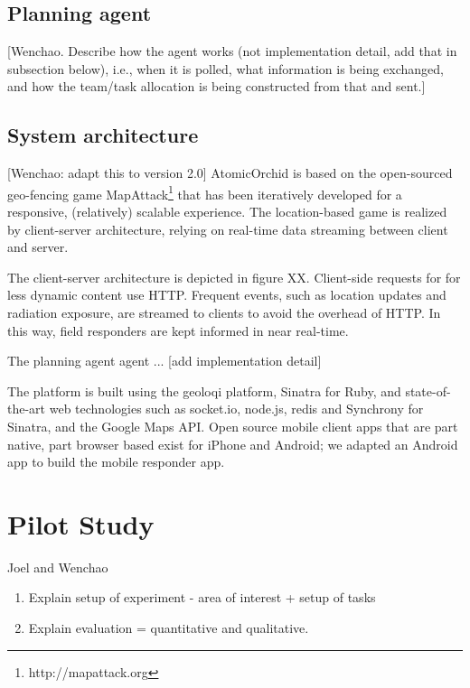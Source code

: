 \documentclass{aamas2014}
\begin{document}
\subsection{Planning agent}
[Wenchao. Describe how the agent works (not implementation detail, add that in subsection below), i.e., when it is polled, what information is being exchanged, and how the team/task allocation is being constructed from that and sent.]

\subsection{System architecture}
[Wenchao: adapt this to version 2.0] AtomicOrchid is based on the open-sourced geo-fencing game MapAttack\footnote{http://mapattack.org} that has been iteratively developed for a responsive, (relatively) scalable experience.  The location-based game is realized by client-server architecture, relying on real-time data streaming between client and server.

The client-server architecture is depicted in figure XX. Client-side requests for for less dynamic content use HTTP. Frequent events, such as location updates and radiation exposure, are streamed to clients to avoid the overhead of HTTP. In this way, field responders are kept informed in near real-time.

The planning agent agent ... [add implementation detail]

The platform is built using the geoloqi platform, Sinatra for Ruby, and state-of-the-art web technologies such as socket.io, node.js, redis and Synchrony for Sinatra, and the Google Maps API. Open source mobile client apps that are part native, part browser based exist for iPhone and Android; we adapted an Android app to build the mobile responder app.

\section{Pilot Study}
Joel and Wenchao
\begin{enumerate}
\item Explain setup of experiment - area of interest + setup of tasks
\item Explain evaluation = quantitative and qualitative.
\end{enumerate}
\end{document}
